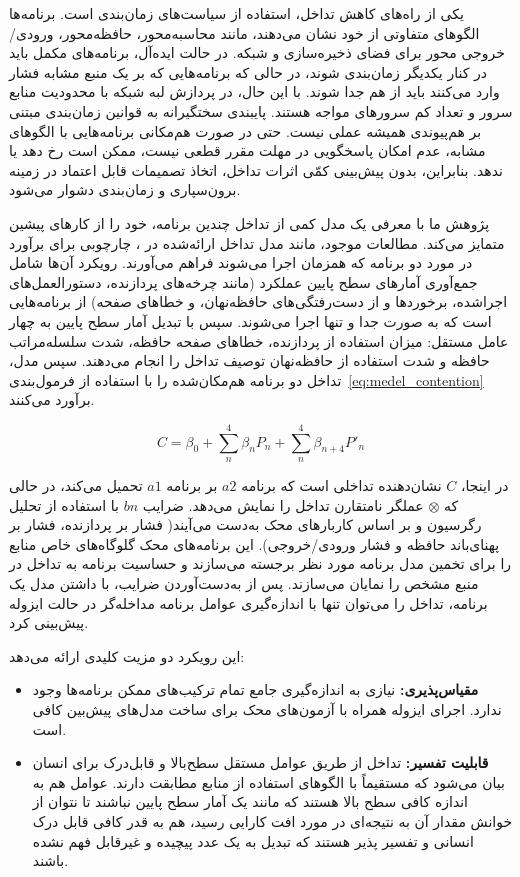 یکی از راه‌های کاهش تداخل، استفاده از سیاست‌های زمان‌بندی است. برنامه‌ها الگوهای متفاوتی از خود نشان می‌دهند، مانند محاسبه‌محور، حافظه‌محور، ورودی/خروجی ‌محور برای فضای ذخیره‌سازی و شبکه. در حالت ایده‌آل، برنامه‌های مکمل باید در کنار یکدیگر زمان‌بندی شوند، در حالی که برنامه‌هایی که بر یک منبع مشابه فشار وارد می‌کنند باید از هم جدا شوند. با این حال، در پردازش لبه شبکه با محدودیت منابع سرور و تعداد کم سرورهای  مواجه هستند. پایبندی سختگیرانه به قوانین زمان‌بندی مبتنی بر هم‌پیوندی همیشه عملی نیست. حتی در صورت هم‌مکانی برنامه‌هایی با الگوهای مشابه، عدم امکان پاسخگویی در مهلت مقرر قطعی نیست، ممکن است رخ دهد یا ندهد. بنابراین، بدون پیش‌بینی کمّی اثرات تداخل، اتخاذ تصمیمات قابل اعتماد در زمینه برون‌سپاری و زمان‌بندی دشوار می‌شود.

پژوهش ما با معرفی یک مدل کمی از تداخل چندین برنامه، خود را از کارهای پیشین متمایز می‌کند. مطالعات موجود، مانند مدل تداخل ارائه‌شده در \cite{medel2023modeling}، چارچوبی برای برآورد در مورد دو برنامه که همزمان اجرا می‌شوند فراهم می‌آورند. رویکرد آن‌ها شامل جمع‌آوری آمارهای سطح پایین عملکرد (مانند چرخه‌های پردازنده، دستورالعمل‌های اجراشده، برخوردها و از دست‌رفتگی‌های حافظه‌نهان، و خطاهای صفحه) از برنامه‌هایی است که به صورت جدا و تنها اجرا می‌شوند. سپس با تبدیل آمار سطح پایین به چهار عامل مستقل: میزان استفاده از پردازنده، خطاهای صفحه حافظه، شدت سلسله‌مراتب حافظه و شدت استفاده از حافظه‌نهان توصیف تداخل را انجام می‌دهند. سپس مدل، تداخل دو برنامه هم‌مکان‌شده را با استفاده از فرمول‌بندی~\eqref{eq:medel_contention} برآورد می‌کنند.

\begin{equation} \label{eq:medel_contention}
    C = \beta_0 + \sum_n^4 \beta_n P_n + \sum_n^4 \beta_{n+4}P'_n
\end{equation}

در اینجا، $C$ نشان‌دهنده تداخلی است که برنامه $a2$ بر برنامه $a1$ تحمیل می‌کند، در حالی که $⊗$ عملگر نامتقارن تداخل را نمایش می‌دهد. ضرایب $bn$ با استفاده از تحلیل رگرسیون و بر اساس کاربارهای محک به‌دست می‌آیند( فشار بر پردازنده،  فشار بر پهنای‌باند حافظه و  فشار ورودی/خروجی). این برنامه‌های محک گلوگاه‌های خاص منابع را برای تخمین مدل برنامه مورد نظر برجسته می‌سازند و حساسیت برنامه به تداخل در منبع مشخص را نمایان می‌سازند. پس از به‌دست‌آوردن ضرایب، با داشتن مدل یک برنامه، تداخل را می‌توان تنها با اندازه‌گیری عوامل برنامه مداخله‌گر در حالت ایزوله پیش‌بینی کرد.

این رویکرد دو مزیت کلیدی ارائه می‌دهد:

\begin{itemize}
\item
\textbf{مقیاس‌پذیری:} نیازی به اندازه‌گیری جامع تمام ترکیب‌های ممکن برنامه‌ها وجود ندارد. اجرای ایزوله همراه با آزمون‌های محک برای ساخت مدل‌های پیش‌بین کافی است.
\item
\textbf{قابلیت تفسیر:} تداخل از طریق عوامل مستقل سطح‌بالا و قابل‌درک برای انسان بیان می‌شود که مستقیماً با الگوهای استفاده از منابع مطابقت دارند. عوامل هم به اندازه کافی سطح بالا هستند که مانند یک آمار سطح پایین نباشند تا نتوان از خوانش مقدار آن به نتیجه‌ای در مورد افت کارایی رسید، هم به قدر کافی قابل درک انسانی و تفسیر پذیر هستند که تبدیل به یک عدد پیچیده و غیرقابل فهم نشده باشند.
\end{itemize}

